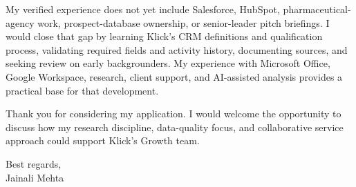 \documentclass[letterpaper,11pt]{article}
\begin{document}
\bigbreak
My verified experience does not yet include Salesforce, HubSpot, pharmaceutical-agency work, prospect-database ownership, or senior-leader pitch briefings. I would close that gap by learning Klick's CRM definitions and qualification process, validating required fields and activity history, documenting sources, and seeking review on early backgrounders. My experience with Microsoft Office, Google Workspace, research, client support, and AI-assisted analysis provides a practical base for that development.

\bigbreak
Thank you for considering my application. I would welcome the opportunity to discuss how my research discipline, data-quality focus, and collaborative service approach could support Klick's Growth team.

\bigbreak
Best regards,\\
Jainali Mehta
\end{document}
